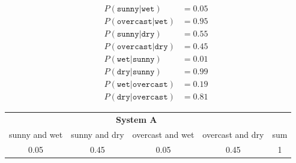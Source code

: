 \begin{align*}
P(\texttt{sunny} | \texttt{wet}) &= 0.05 \\
P(\texttt{overcast} | \texttt{wet}) &= 0.95 \\
P(\texttt{sunny} | \texttt{dry}) &= 0.55 \\
P(\texttt{overcast} | \texttt{dry}) &= 0.45 \\
P(\texttt{wet} | \texttt{sunny}) &= 0.01 \\
P(\texttt{dry} | \texttt{sunny}) &= 0.99 \\
P(\texttt{wet} | \texttt{overcast}) &= 0.19 \\
P(\texttt{dry} | \texttt{overcast}) &= 0.81
\end{align*}


\begin{center}

  \begin{tabular}{c | c | c | c || c}
   \multicolumn{4}{c}{\textbf{System A}} & {}\\
   sunny and wet & sunny and dry & overcast and wet & overcast and dry & sum \\ [0.5ex]
  \hline\hline
   0.05 & 0.45 & 0.05 & 0.45 & 1 \\ [1ex]
 \end{tabular}

\end{center}
